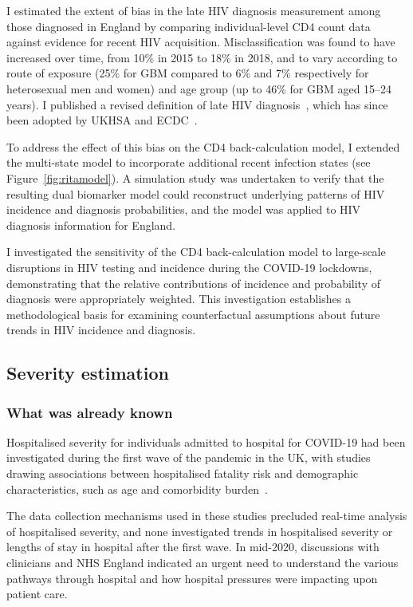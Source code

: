 I estimated the extent of bias in the late HIV diagnosis measurement among those diagnosed in England by comparing individual-level CD4 count data against evidence for recent HIV acquisition. Misclassification was found to have increased over time, from 10\% in 2015 to 18\% in 2018, and to vary according to route of exposure (25\% for GBM compared to 6\% and 7\% respectively for heterosexual men and women) and age group (up to 46\% for GBM aged 15--24 years). I published a revised definition of late HIV diagnosis~\parencite{Kirwan2022-za}, which has since been adopted by UKHSA and ECDC~\parencite{Martin2023-um, Croxford2022-cv}.

To address the effect of this bias on the CD4 back-calculation model, I extended the multi-state model to incorporate additional recent infection states (see Figure~\ref{fig:ritamodel}). A simulation study was undertaken to verify that the resulting dual biomarker model could reconstruct underlying patterns of HIV incidence and diagnosis probabilities, and the model was applied to HIV diagnosis information for England.

I investigated the sensitivity of the CD4 back-calculation model to large-scale disruptions in HIV testing and incidence during the COVID-19 lockdowns, demonstrating that the relative contributions of incidence and probability of diagnosis were appropriately weighted. This investigation establishes a methodological basis for examining counterfactual assumptions about future trends in HIV incidence and diagnosis.

\subsection{Severity estimation}

\subsubsection{What was already known}

Hospitalised severity for individuals admitted to hospital for COVID-19 had been investigated during the first wave of the pandemic in the UK, with studies drawing associations between hospitalised fatality risk and demographic characteristics, such as age and comorbidity burden~\parencite{Ferrando-Vivas2021-ut, Docherty2021-es, Agrawal2021-ee, Gray2021-xk, Mathur2021-zf}.

The data collection mechanisms used in these studies precluded real-time analysis of hospitalised severity, and none investigated trends in hospitalised severity or lengths of stay in hospital after the first wave. In mid-2020, discussions with clinicians and NHS England indicated an urgent need to understand the various pathways through hospital and how hospital pressures were impacting upon patient care.

